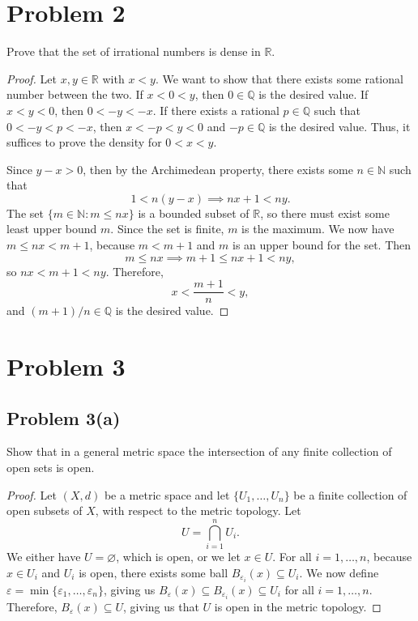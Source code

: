 \documentclass[12pt]{article}
\newenvironment{problem}
    {\begin{lrbox}{\mybox}\begin{minipage}{\textwidth-10pt}}
    {\end{minipage}\end{lrbox}\framebox[6.5in]{\usebox{\mybox}}}
\newcommand{\<}{\left\langle}
\renewcommand{\>}{\right\rangle}
\newcommand{\N}{\mathbb{N}}
\newcommand{\R}{\mathbb{R}}
\newcommand{\Q}{\mathbb{Q}}
\let\eps\varepsilon
\let\emptyset\varnothing
\begin{document}
\newpage
\section*{Problem 2}
\begin{problem}
    Prove that the set of irrational numbers is dense in $\R$.
\end{problem}

\begin{proof}
    Let $x,y\in\R$ with $x<y$. We want to show that there exists some rational number between the two. If $x<0<y$, then $0\in\Q$ is the desired value. If $x<y<0$, then $0<-y<-x$. If there exists a rational $p\in\Q$ such that $0<-y<p<-x$, then $x<-p<y<0$ and $-p\in\Q$ is the desired value. Thus, it suffices to prove the density for $0<x<y$.
    
    Since $y-x > 0$, then by the Archimedean property, there exists some $n\in\N$ such that
    \[1 < n(y-x) \implies nx + 1< ny.\]
    The set $\{m\in\N : m \leq nx\}$ is a bounded subset of $\R$, so there must exist some least upper bound $m$. Since the set is finite, $m$ is the maximum. We now have $m\leq nx < m+1$, because $m<m+1$ and $m$ is an upper bound for the set. Then
    \[m \leq nx \implies m+1 \leq nx + 1 < ny,\]
    so $nx< m+1 < ny$. Therefore,
    \[x < \frac{m+1}{n} < y,\]
    and $(m+1)/n\in\Q$ is the desired value.
    
    
\end{proof}

\newpage
\section*{Problem 3}

\subsection*{Problem 3(a)}
\begin{problem}
    Show that in a general metric space the intersection of any finite collection of open sets is open.
\end{problem}

\begin{proof}
    Let $(X,d)$ be a metric space and let $\{U_1,\dots,U_n\}$ be a finite collection of open subsets of $X$, with respect to the metric topology. Let 
    \[U = \bigcap_{i=1}^nU_i.\]
    We either have $U = \emptyset$, which is open, or we let $x\in U$. For all $i=1,\dots,n$, because $x\in U_i$ and $U_i$ is open, there exists some ball $B_{\eps_i}(x) \subseteq U_i$. We now define $\eps = \min\{\eps_1,\dots,\eps_n\}$, giving us $B_\eps(x) \subseteq B_{\eps_i}(x) \subseteq U_i$ for all $i=1,\dots,n$. Therefore, $B_\eps(x)\subseteq U$, giving us that $U$ is open in the metric topology.
     
\end{proof}
\end{document}
